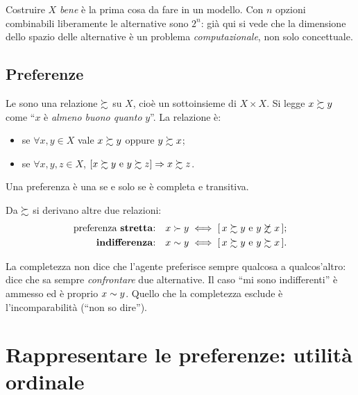 \begin{osservazione}
Costruire $X$ \emph{bene} è la prima cosa da fare in un modello. Con $n$ opzioni
combinabili liberamente le alternative sono $2^n$: già qui si vede che la dimensione
dello spazio delle alternative è un problema \emph{computazionale}, non solo concettuale.
\end{osservazione}

\subsection{Preferenze}

\begin{definizione}
Le  sono una relazione $\succsim$ su $X$, cioè un sottoinsieme di $X \times X$.
Si legge $x \succsim y$ come ``$x$ è \emph{almeno buono quanto} $y$''. La relazione è:
\begin{itemize}
  \item {} se $\forall x,y \in X$ vale $x \succsim y$ oppure $y \succsim x$;
  \item {} se $\forall x,y,z \in X$, $[x \succsim y \text{ e } y \succsim z]
        \Rightarrow x \succsim z$.
\end{itemize}
Una preferenza è una  se e solo se è completa e transitiva.
\end{definizione}

Da $\succsim$ si derivano altre due relazioni:
\begin{align*}
  \text{preferenza \textbf{stretta}:} && x \succ y &\iff [\,x \succsim y \ \text{e}\ y \not\succsim x\,];\\
  \text{\textbf{indifferenza}:}       && x \sim y &\iff [\,x \succsim y \ \text{e}\ y \succsim x\,].
\end{align*}

\begin{osservazione}
La completezza non dice che l'agente preferisce sempre qualcosa a qualcos'altro: dice che
sa sempre \emph{confrontare} due alternative. Il caso ``mi sono indifferenti'' è ammesso
ed è proprio $x \sim y$. Quello che la completezza esclude è l'incomparabilità
(``non so dire'').
\end{osservazione}

\section{Rappresentare le preferenze: utilità ordinale}

